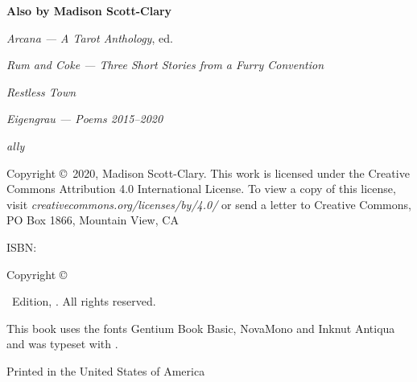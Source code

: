 \singlespacing
\thispagestyle{empty}
\null
\vfill
\begin{center}
    \noindent\textbf{Also by Madison Scott-Clary}

    \emph{Arcana --- A Tarot Anthology}, ed.

    \emph{Rum and Coke --- Three Short Stories from a Furry Convention}

    \emph{Restless Town}

    \emph{Eigengrau --- Poems 2015--2020}

    \emph{ally}
\end{center}
\vfill
\singlespacing
{\small\parindent0pt\parskip5pt
\noindent Copyright \copyright\ 2020, Madison Scott-Clary. This work is licensed under the Creative Commons Attribution 4.0 International License. To view a copy of this license, visit \mbox{\emph{creativecommons.org/licenses/by/4.0/}} or send a letter to Creative Commons, PO Box 1866, Mountain View, CA

\vspace{1ex}

ISBN: \ISBN

\vspace{1ex}

\textsc{\FullTitle}

\vspace{1ex}

Copyright \copyright\ \Year\ \Publisher

\vspace{1ex}

\Edition\ Edition, \Year. All rights reserved.

\vspace{1ex}

This book uses the fonts Gentium Book Basic, {\DisplayFont NovaMono} and {\TitleFont Inknut Antiqua} and was typeset with {\XeLaTeX}.

Printed in the United States of America\\
\EditionsList
}%

\clearpage
